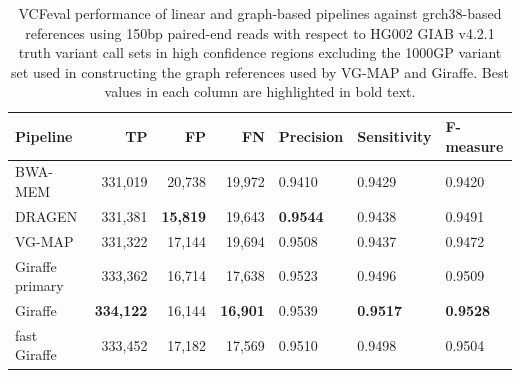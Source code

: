 \documentclass[11pt]{ucscthesis}
\begin{document}
\begin{table}[p]
    \centering
    \begin{tabular}{|l|r|r|r|l|l|l|}
     \hline
    Pipeline                    & TP                 & FP              & FN              & Precision       & Sensitivity     & F-measure       \\
     \hline
    BWA-MEM                     & 331,019            & 20,738          & 19,972          & 0.9410          & 0.9429          & 0.9420         \\
    DRAGEN                      & 331,381            & \textbf{15,819} & 19,643          & \textbf{0.9544} & 0.9438          & 0.9491          \\
    VG-MAP                      & 331,322            & 17,144          & 19,694          & 0.9508          & 0.9437          & 0.9472          \\
    Giraffe primary             & 333,362            & 16,714          & 17,638          & 0.9523          & 0.9496          & 0.9509         \\
    Giraffe                     & \textbf{334,122}   & 16,144          & \textbf{16,901} & 0.9539          & \textbf{0.9517} & \textbf{0.9528}\\
    fast Giraffe                & 333,452            & 17,182          & 17,569          & 0.9510          & 0.9498          & 0.9504         \\
    \hline
    \end{tabular}
\caption[Genotyping evaluation with VCFeval in HG002 using 150bp paired-end reads against the grch38-based graph reference in regions excluding the 1000GP variant set]{VCFeval performance of linear and graph-based pipelines against grch38-based references using 150bp paired-end reads with respect to HG002 GIAB v4.2.1 truth variant call sets in high confidence regions excluding the 1000GP variant set used in constructing the graph references used by VG-MAP and Giraffe. Best values in each column are highlighted in bold text.}
\label{tab:vcfeval_high_conf_1000GP_excluded_2x150_hg002_grch38}
\end{table}
\end{document}
